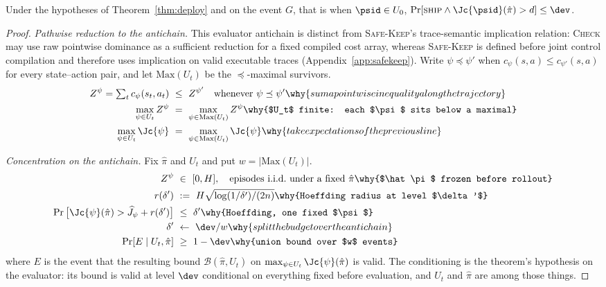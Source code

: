 \begin{lemma}
\label{lem:deploycond}
Under the hypotheses of Theorem~\ref{thm:deploy} and on the event $G$, that is when
$\psid\in U_0$,
$\Pr[\textsc{ship}\wedge\Jc{\psid}(\hat\pi)>d]\le\dev$.
\end{lemma}

\begin{proof}
\emph{Pathwise reduction to the antichain.} This evaluator antichain is distinct
from \textsc{Safe-Keep}'s trace-semantic implication relation: \textsc{Check} may use
raw pointwise dominance as a sufficient reduction for a fixed compiled cost array,
whereas \textsc{Safe-Keep} is defined before joint control compilation and therefore
uses implication on valid executable traces (Appendix~\ref{app:safekeep}).
Write $\psi\preceq\psi'$ when
$c_\psi(s,a)\le c_{\psi'}(s,a)$ for every state--action pair, and let
$\mathrm{Max}(U_t)$ be the $\preceq$-maximal survivors.
\begin{align*}
Z^\psi=\textstyle\sum_t c_\psi(s_t,a_t)\ &\le\ Z^{\psi'}
   \quad\text{whenever }\psi\preceq\psi'
   \why{sum a pointwise inequality along the trajectory}\\
\max_{\psi\in U_t}Z^\psi\ &=\ \max_{\psi\in\mathrm{Max}(U_t)}Z^\psi
   \why{$U_t$ finite: each $\psi$ sits below a maximal}\\
\max_{\psi\in U_t}\Jc{\psi}\ &=\ \max_{\psi\in\mathrm{Max}(U_t)}\Jc{\psi}
   \why{take expectations of the previous line}
\end{align*}

\emph{Concentration on the antichain.} Fix $\hat\pi$ and $U_t$ and put
$w=|\mathrm{Max}(U_t)|$.
\begin{align*}
Z^\psi\ &\in\ [0,H],\quad\text{episodes i.i.d.\ under a fixed }\hat\pi
   \why{$\hat\pi$ frozen before rollout}\\
r(\delta')\ &:=\ H\sqrt{\log(1/\delta')/(2n)}
   \why{Hoeffding radius at level $\delta'$}\\
\Pr\big[\Jc{\psi}(\hat\pi)>\widehat J_\psi+r(\delta')\big]\ &\le\ \delta'
   \why{Hoeffding, one fixed $\psi$}\\
\delta'\ &\leftarrow\ \dev/w \why{split the budget over the antichain}\\
\Pr[E\mid U_t,\hat\pi]\ &\ge\ 1-\dev
   \why{union bound over $w$ events}
\end{align*}
where $E$ is the event that the resulting bound
$\mathcal B(\hat\pi,U_t)$ on $\max_{\psi\in U_t}\Jc{\psi}(\hat\pi)$ is valid. The
conditioning is the theorem's hypothesis on the evaluator: its bound is valid at
level $\dev$ conditional on everything fixed before evaluation, and $U_t$ and
$\hat\pi$ are among those things.


\end{proof}
